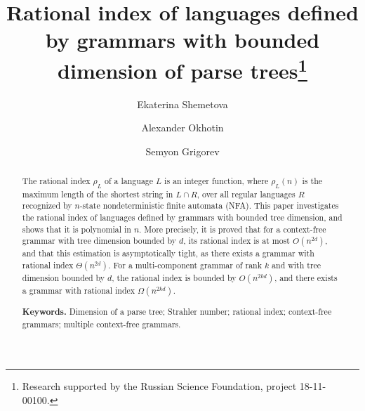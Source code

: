 \documentclass[runningheads]{llncs}
\begin{document}
\sloppy

\title{Rational index of languages defined by grammars with bounded dimension of parse trees\thanks{%
	Research supported by the Russian Science Foundation, project 18-11-00100.}
}

\author{Ekaterina Shemetova
\and
Alexander Okhotin
\and
Semyon Grigorev
}




\maketitle


\begin{abstract}
The rational index $\rho_L$ of a language $L$ is an integer function,
where $\rho_L(n)$ is the maximum length of the shortest string in $L \cap R$,
over all regular languages $R$ recognized by $n$-state nondeterministic finite automata (NFA).
This paper investigates the rational index of languages
defined by grammars with bounded tree dimension,
and shows that it is polynomial in $n$.
More precisely, it is proved that for a context-free grammar with tree dimension bounded by $d$,
its rational index is at most $O(n^{2d})$,
and that this estimation is asymptotically tight,
as there exists a grammar with rational index $\Theta(n^{2d})$.
For a multi-component grammar of rank $k$ and with tree dimension bounded by $d$,
the rational index is bounded by $O(n^{2kd})$,
and there exists a grammar with rational index $\Omega(n^{2kd})$.

\textbf{Keywords.}
Dimension of a parse tree; Strahler number; rational index; context-free grammars; multiple context-free grammars.
\end{abstract}
\end{document}

